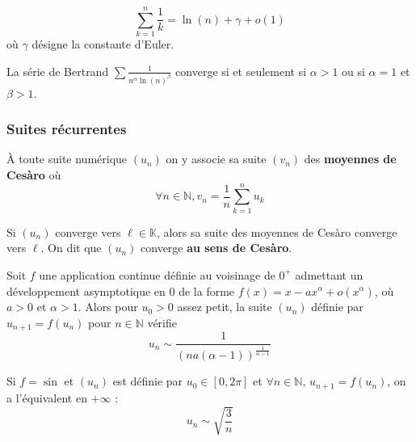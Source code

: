 	\begin{application}
		\[ \sum_{k=1}^n \frac{1}{k} = \ln(n) + \gamma + o (1) \]
		où $\gamma$ désigne la constante d'Euler.
	\end{application}

	\begin{application}
		La série de Bertrand $\sum \frac{1}{n^\alpha \ln(n)^\beta}$ converge si et seulement si $\alpha > 1$ ou si $\alpha = 1$ et $\beta > 1$.
	\end{application}

	\newpage

	\subsubsection{Suites récurrentes}


	\begin{definition}
		À toute suite numérique $(u_n)$ on y associe sa suite $(v_n)$ des \textbf{moyennes de Cesàro} où
		\[ \forall n \in \mathbb{N}, v_n = \frac{1}{n} \sum_{k=1}^{n} u_k \]
	\end{definition}

	\begin{theorem}
		Si $(u_n)$ converge vers $\ell \in \mathbb{K}$, alors sa suite des moyennes de Cesàro converge vers $\ell$. On dit que $(u_n)$ converge \textbf{au sens de Cesàro}.
	\end{theorem}


	\begin{proposition}
		Soit $f$ une application continue définie au voisinage de $0^+$ admettant
		un développement asymptotique en $0$ de la forme $f(x) = x - ax^\alpha + o(x^\alpha)$, où $a > 0$ et $\alpha > 1$. Alors pour $u_0 > 0$ assez petit, la suite $(u_n)$ définie par $u_{n+1} = f(u_n)$ pour $n \in \mathbb{N}$ vérifie
		\[ u_n \sim \frac{1}{(na(\alpha-1))^{\frac{1}{\alpha-1}}} \]
	\end{proposition}

	\begin{example}
		Si $f = \sin$ et $(u_n)$ est définie par $u_0 \in [0, 2\pi]$ et $\forall n \in \mathbb{N}, \, u_{n+1} = f(u_n)$, on a l'équivalent en $+\infty$ :
		\[ u_n \sim \sqrt{\frac{3}{n}} \]
	\end{example}


